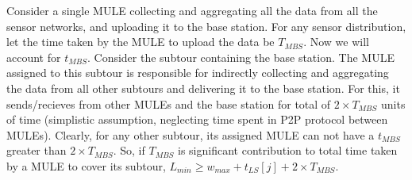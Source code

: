 Consider a single MULE collecting and aggregating all the data from all the sensor networks, and uploading it to the base station. For any sensor distribution, let the time taken by the MULE to upload the data be $T_{MBS}$. Now we will account for $t_{MBS}$. Consider the subtour containing the base station. The MULE assigned to this subtour is responsible for indirectly collecting and aggregating the data from all other subtours and delivering it to the base station. For this, it sends/recieves from other MULEs and the base station for total of $2 \times T_{MBS}$ units of time (simplistic assumption, neglecting time spent in P2P protocol between MULEs). Clearly, for any other subtour, its assigned MULE can not have a $t_{MBS}$ greater than $2 \times T_{MBS}$. So, if $T_{MBS}$ is significant contribution to total time taken by a MULE to cover its subtour, $L_{min} \ge w_{max}+t_{LS}[j]+2 \times T_{MBS}$.